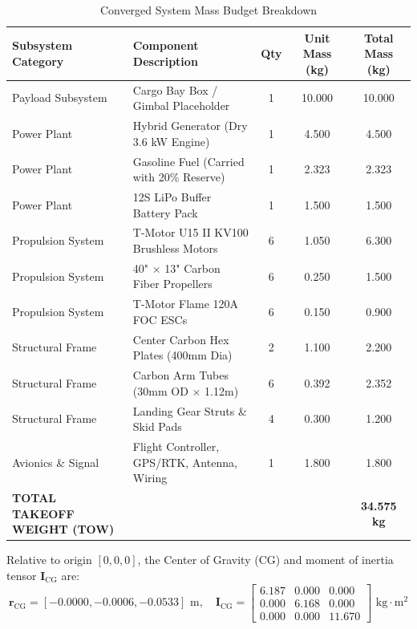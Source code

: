 \documentclass[11pt,a4paper]{article}
\begin{document}
\begin{table}[H]
    \centering
    \caption{Converged System Mass Budget Breakdown}
    \begin{tabular}{llccc}
        \toprule
        \textbf{Subsystem Category} & \textbf{Component Description} & \textbf{Qty} & \textbf{Unit Mass (kg)} & \textbf{Total Mass (kg)} \\
        \midrule
        Payload Subsystem & Cargo Bay Box / Gimbal Placeholder & 1 & 10.000 & 10.000 \\
        Power Plant & Hybrid Generator (Dry 3.6 kW Engine) & 1 & 4.500 & 4.500 \\
        Power Plant & Gasoline Fuel (Carried with 20\% Reserve) & 1 & 2.323 & 2.323 \\
        Power Plant & 12S LiPo Buffer Battery Pack & 1 & 1.500 & 1.500 \\
        Propulsion System & T-Motor U15 II KV100 Brushless Motors & 6 & 1.050 & 6.300 \\
        Propulsion System & 40" $\times$ 13" Carbon Fiber Propellers & 6 & 0.250 & 1.500 \\
        Propulsion System & T-Motor Flame 120A FOC ESCs & 6 & 0.150 & 0.900 \\
        Structural Frame & Center Carbon Hex Plates (400mm Dia) & 2 & 1.100 & 2.200 \\
        Structural Frame & Carbon Arm Tubes (30mm OD $\times$ 1.12m) & 6 & 0.392 & 2.352 \\
        Structural Frame & Landing Gear Struts \& Skid Pads & 4 & 0.300 & 1.200 \\
        Avionics \& Signal & Flight Controller, GPS/RTK, Antenna, Wiring & 1 & 1.800 & 1.800 \\
        \midrule
        \textbf{TOTAL TAKEOFF WEIGHT (TOW)} & & & & \textbf{34.575 kg} \\
        \bottomrule
    \end{tabular}
\end{table}

Relative to origin $[0, 0, 0]$, the Center of Gravity (CG) and moment of inertia tensor $\mathbf{I}_{\text{CG}}$ are:
\begin{equation}
    \mathbf{r}_{\text{CG}} = [-0.0000, -0.0006, -0.0533]\text{ m}, \quad
    \mathbf{I}_{\text{CG}} = \begin{bmatrix}
        6.187 & 0.000 & 0.000 \\
        0.000 & 6.168 & 0.000 \\
        0.000 & 0.000 & 11.670
    \end{bmatrix} \text{ kg}\cdot\text{m}^2
\end{equation}
\end{document}
